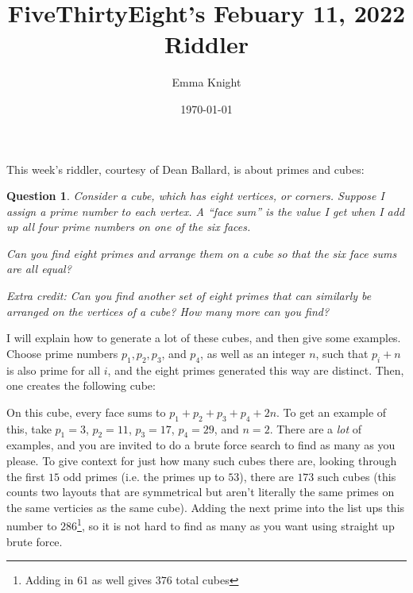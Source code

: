 \documentclass[11pt]{article}
\title{FiveThirtyEight's Febuary 11, 2022 Riddler}
\author{Emma Knight}
\date{\today}
\newtheorem{question}[theorem]{Question}
\theoremstyle{definition}
\begin{document}
\maketitle
This week's riddler, courtesy of Dean Ballard, is about primes and cubes:
\begin{question}
Consider a cube, which has eight vertices, or corners. Suppose I assign a prime number to each vertex. A ``face sum'' is the value I get when I add up all four prime numbers on one of the six faces.

Can you find eight primes and arrange them on a cube so that the six face sums are all equal?

\emph{Extra credit}: Can you find another set of eight primes that can similarly be arranged on the vertices of a cube? How many more can you find?
\end{question}

I will explain how to generate a lot of these cubes, and then give some examples.  Choose prime numbers $p_1, p_2, p_3$, and $p_4$, as well as an integer $n$, such that $p_i + n$ is also prime for all $i$, and the eight primes generated this way are distinct.  Then, one creates the following cube:


On this cube, every face sums to $p_1 + p_2 + p_3 + p_4 + 2n$.  To get an example of this, take $p_1 = 3$, $p_2 = 11$, $p_3 = 17$, $p_4 = 29$, and $n = 2$.  There are a \emph{lot} of examples, and you are invited to do a brute force search to find as many as you please.  To give context for just how many such cubes there are, looking through the first $15$ odd primes (i.e. the primes up to $53$), there are $173$ such cubes (this counts two layouts that are symmetrical but aren't literally the same primes on the same verticies as the same cube).  Adding the next prime into the list ups this number to $286$\footnote{Adding in $61$ as well gives $376$ total cubes}, so it is not hard to find as many as you want using straight up brute force.
\end{document}
